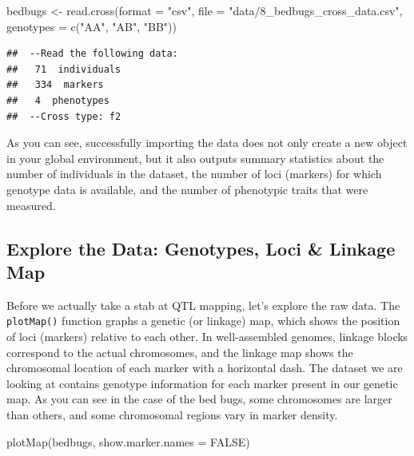 \documentclass[
]{book}
\newenvironment{Shaded}{\begin{snugshade}}{\end{snugshade}}
\newcommand{\AttributeTok}[1]{\textcolor[rgb]{0.77,0.63,0.00}{#1}}
\newcommand{\ConstantTok}[1]{\textcolor[rgb]{0.00,0.00,0.00}{#1}}
\newcommand{\FunctionTok}[1]{\textcolor[rgb]{0.00,0.00,0.00}{#1}}
\newcommand{\NormalTok}[1]{#1}
\newcommand{\OtherTok}[1]{\textcolor[rgb]{0.56,0.35,0.01}{#1}}
\newcommand{\StringTok}[1]{\textcolor[rgb]{0.31,0.60,0.02}{#1}}
\begin{document}
\begin{Shaded}
\begin{Highlighting}[]
\NormalTok{bedbugs }\OtherTok{\textless{}{-}} \FunctionTok{read.cross}\NormalTok{(}\AttributeTok{format =} \StringTok{"csv"}\NormalTok{, }\AttributeTok{file =} \StringTok{"data/8\_bedbugs\_cross\_data.csv"}\NormalTok{, }\AttributeTok{genotypes =} \FunctionTok{c}\NormalTok{(}\StringTok{"AA"}\NormalTok{, }\StringTok{"AB"}\NormalTok{, }\StringTok{"BB"}\NormalTok{))}
\end{Highlighting}
\end{Shaded}

\begin{verbatim}
##  --Read the following data:
##   71  individuals
##   334  markers
##   4  phenotypes
##  --Cross type: f2
\end{verbatim}

As you can see, successfully importing the data does not only create a new object in your global environment, but it also outputs summary statistics about the number of individuals in the dataset, the number of loci (markers) for which genotype data is available, and the number of phenotypic traits that were measured.

\hypertarget{explore-the-data-genotypes-loci-linkage-map}{%
\subsection{Explore the Data: Genotypes, Loci \& Linkage Map}\label{explore-the-data-genotypes-loci-linkage-map}}

Before we actually take a stab at QTL mapping, let's explore the raw data. The \texttt{plotMap()} function graphs a genetic (or linkage) map, which shows the position of loci (markers) relative to each other. In well-assembled genomes, linkage blocks correspond to the actual chromosomes, and the linkage map shows the chromosomal location of each marker with a horizontal dash. The dataset we are looking at contains genotype information for each marker present in our genetic map. As you can see in the case of the bed bugs, some chromosomes are larger than others, and some chromosomal regions vary in marker density.

\begin{Shaded}
\begin{Highlighting}[]
\FunctionTok{plotMap}\NormalTok{(bedbugs, }\AttributeTok{show.marker.names =} \ConstantTok{FALSE}\NormalTok{)}
\end{Highlighting}
\end{Shaded}
\end{document}
